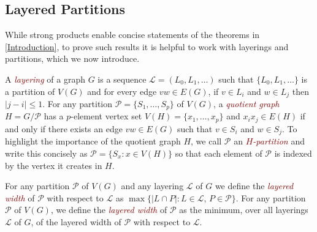 \documentclass{patmorin}
\newcommand{\defin}[1]{\textcolor{Maroon}{\emph{#1}}}
\newcommand{\note}[2]{\noindent{\color{red}[#1:~#2]}}
\DeclareMathOperator{\tw}{tw}
\newcommand{\PP}{\mathcal{P}}
\renewcommand{\SS}{\mathcal{S}}
\renewcommand{\geq}{\geqslant}
\renewcommand{\leq}{\leqslant}
\begin{document}
%
%
%
%


\subsection{Layered Partitions}
\label{LayeredPartitions}

While strong products enable concise statements of the theorems in \cref{Introduction}, to prove such results it is helpful to work with layerings and partitions, which we now introduce.

A \defin{layering} of a graph $G$ is a sequence $\mathcal{L}=(L_0,L_1,\ldots)$ such that $\{L_0,L_1,\ldots\}$ is a partition of $V(G)$ and for every edge $vw\in E(G)$, if $v\in L_i$ and $w\in L_j$ then $|j-i|\leq 1$.  For any partition $\PP=\{S_1,\ldots,S_p\}$ of $V(G)$, a \defin{quotient graph} $H=G/\PP$ has a $p$-element vertex set $V(H)=\{x_1,\ldots,x_p\}$ and $x_ix_j\in E(H)$ if and only if there exists an edge $vw\in E(G)$ such that $v\in S_i$ and $w\in S_j$. To highlight the importance of the quotient graph $H$, we call $\PP$ an \defin{$H$-partition} and write this concisely as $\PP=\{S_x : x\in V(H)\}$ so that each element of $\PP$ is indexed by the vertex it creates in $H$.

For any partition $\PP$ of $V(G)$ and any layering $\mathcal{L}$ of $G$ we define the \defin{layered width} of $\PP$ with respect to $\mathcal{L}$ as $\max\{|L\cap P|: L\in\mathcal{L},\, P\in\PP\}$.  For any partition $\PP$ of $V(G)$, we define the \defin{layered width} of $\PP$ as the minimum, over all layerings $\mathcal{L}$ of $G$, of the layered width of $\PP$ with respect to $\mathcal{L}$.
\end{document}

